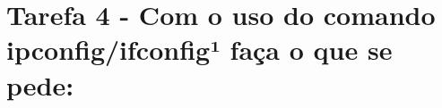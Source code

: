 \section*{Tarefa 4 - Com o uso do comando ipconfig/ifconfig¹ faça o que se pede:}

\begin{questions}
    
    
\end{questions}








